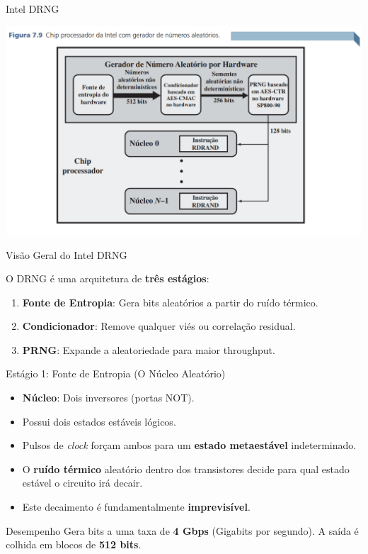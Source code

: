 \begin{frame}{Intel DRNG}

\centering
\includegraphics[width=0.9\linewidth]{Figuras/gerador-numero-aleatorio-intel.png}


\end{frame}


\begin{frame}{Visão Geral do Intel DRNG}

    O DRNG é uma arquitetura de \textbf{três estágios}:
    \begin{enumerate}
        \item \textbf{Fonte de Entropia}: Gera bits aleatórios a partir do ruído térmico.
        \item \textbf{Condicionador}: Remove qualquer viés ou correlação residual.
        \item \textbf{PRNG}: Expande a aleatoriedade para maior throughput.
    \end{enumerate}
\end{frame}


\begin{frame}{Estágio 1: Fonte de Entropia (O Núcleo Aleatório)}
    
            \begin{itemize}
                \item \textbf{Núcleo}: Dois inversores (portas NOT).
                \item Possui dois estados estáveis lógicos.
                \item Pulsos de \textit{clock} forçam ambos para um \textbf{estado metaestável} indeterminado.
                \item O \textbf{ruído térmico} aleatório dentro dos transistores decide para qual estado estável o circuito irá decair.
                \item Este decaimento é fundamentalmente \textbf{imprevisível}.
            \end{itemize}
    \vspace{0.5cm}
    \begin{block}{Desempenho}
        Gera bits a uma taxa de \textbf{4 Gbps} (Gigabits por segundo). A saída é colhida em blocos de \textbf{512 bits}.
    \end{block}
\end{frame}

